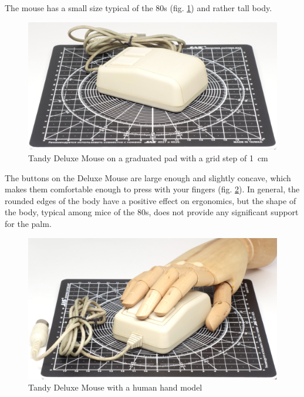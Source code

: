 \documentclass[11pt, a4paper]{article}
\begin{document}
The mouse has a small size typical of the 80s (fig. \ref{fig:TandyDeluxeMouseSize}) and rather tall body.

\begin{figure}[h]
    \centering
    \includegraphics[scale=0.49]{1988_tandy_trs80_deluxe_mouse/size_15.jpg}
    \caption{Tandy Deluxe Mouse on a graduated pad with a grid step of 1~cm}
    \label{fig:TandyDeluxeMouseSize}
\end{figure}

The buttons on the Deluxe Mouse are large enough and slightly concave, which makes them comfortable enough to press with your fingers (fig. \ref{fig:TandyDeluxeMouseHand}). In general, the rounded edges of the body have a positive effect on ergonomics, but the shape of the body, typical among mice of the 80s, does not provide any significant support for the palm.

\begin{figure}[h]
    \centering
    \includegraphics[scale=0.55]{1988_tandy_trs80_deluxe_mouse/hand_15.jpg}
    \caption{Tandy Deluxe Mouse with a human hand model}
    \label{fig:TandyDeluxeMouseHand}
\end{figure}
\end{document}
